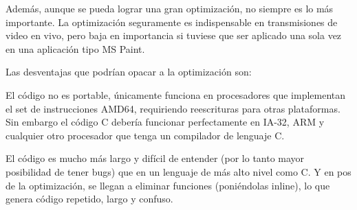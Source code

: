 \documentclass[a4paper,10pt,twoside]{article}
\begin{document}
Además, aunque se pueda lograr una gran optimización, no siempre es lo más importante. La optimización seguramente es indispensable en transmisiones de video en vivo, pero baja en importancia si tuviese que ser aplicado una sola vez en una aplicación tipo MS Paint.

Las desventajas que podrían opacar a la optimización son:

El código no es portable, únicamente funciona en procesadores que implementan el set de instrucciones AMD64, requiriendo reescrituras para otras plataformas. Sin embargo el código C debería funcionar perfectamente en IA-32, ARM y cualquier otro procesador que tenga un compilador de lenguaje C.

El código es mucho más largo y difícil de entender (por lo tanto mayor posibilidad de tener bugs) que en un lenguaje de más alto nivel como C. Y en pos de la optimización, se llegan a eliminar funciones (poniéndolas inline), lo que genera código repetido, largo y confuso.
\end{document}
